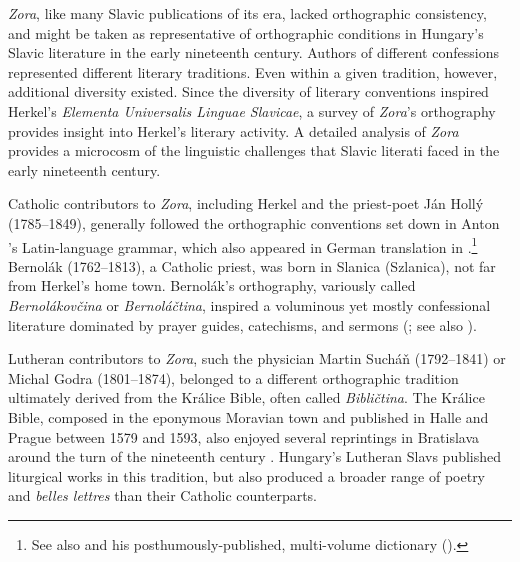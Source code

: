 \textit{Zora}, like many Slavic publications of its era, lacked orthographic consistency, and might be taken as representative of orthographic conditions in Hungary’s Slavic literature in the early nineteenth century. Authors of different confessions represented different literary traditions. Even within a given tradition, however, additional diversity existed. Since the diversity of literary conventions inspired Herkel’s \textit{Elementa Universalis Linguae Slavicae}, a survey of \textit{Zora}’s orthography provides insight into Herkel’s literary activity. A detailed analysis of \textit{Zora} provides a microcosm of the linguistic challenges that Slavic literati faced in the early nineteenth century.

Catholic contributors to \textit{Zora}, including Herkel and the priest-poet Ján Hollý (1785--1849), generally followed the orthographic conventions set down in Anton \linebreak{} \citeauthor{bernolak_grammatica_1790}’s \citeyear{bernolak_grammatica_1790} Latin-language grammar, which also appeared in German translation in \citeyear{bernolak_schlowakische_1817}.\footnote{See also \citet{bernolak_dissertatio_1787} and his posthumously-published, multi-volume dictionary (\citeyear{bernolak_slowar_18251827}).} Bernolák (1762--1813), a Catholic priest, was born in Slanica (Szlanica), not far from Herkel’s home town. Bernolák’s orthography, variously called \textit{Bernolákovčina} or \textit{Bernoláčtina}, inspired a voluminous yet mostly confessional literature dominated by prayer guides, catechisms, and sermons (\cite{kotvan_bibliografia_1957}; see also \cite[85--88]{maxwell_choosing_2009}).

Lutheran contributors to \textit{Zora}, such the physician Martin Sucháň (1792--1841) or Michal Godra (1801--1874), belonged to a different orthographic tradition ultimately derived from the Králice Bible, often called \textit{Bibličtina}. The Králice Bible, composed in the eponymous Moravian town and published in Halle and Prague between 1579 and 1593, also enjoyed several reprintings in Bratislava around the turn of the nineteenth century \citep[175--193]{pisna_druhy_2013}. Hungary’s Lutheran Slavs published liturgical works in this tradition, but also produced a broader range of poetry and \textit{belles lettres} than their Catholic counterparts.

